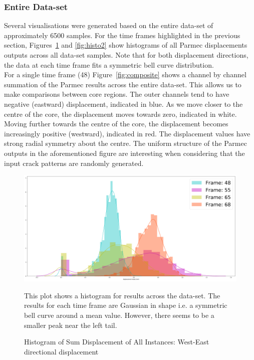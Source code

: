 \subsubsection{Entire Data-set}


Several visualisations were generated based on the entire data-set of approximately 6500 samples. For the time frames highlighted in the previous section, Figures~\ref{fig:histo1} and \ref{fig:histo2} show histograms of all Parmec displacements outputs across all data-set samples. Note that for both displacement directions, the data at each time frame fits a symmetric bell curve distribution. 
\\

\noindent
For a single time frame (48) Figure~\ref{fig:composite} shows a channel by channel summation of the Parmec results across the entire data-set. This allows us to make comparisons between core regions. The outer channels tend to have negative (eastward) displacement, indicated in blue. As we move closer to the centre of the core, the displacement moves towards zero, indicated in white. Moving further towards the centre of the core, the displacement becomes increasingly positive (westward), indicated in red. The displacement values have strong radial symmetry about the centre. The uniform structure of the Parmec outputs in the aforementioned figure are interesting when considering that the input crack patterns are randomly generated.  
\\


\begin{figure}[p]
	\centering
	\includegraphics[scale=0.15]{Figures/histo1.png}
	\caption{Histogram of Sum Displacement of All Instances: West-East directional displacement } {This plot shows a histogram for results across the data-set. The results for each time frame are Gaussian in shape i.e. a symmetric bell curve around a mean value. However, there seems to be a smaller peak near the left tail.}
	\label{fig:histo1}
\end{figure}

